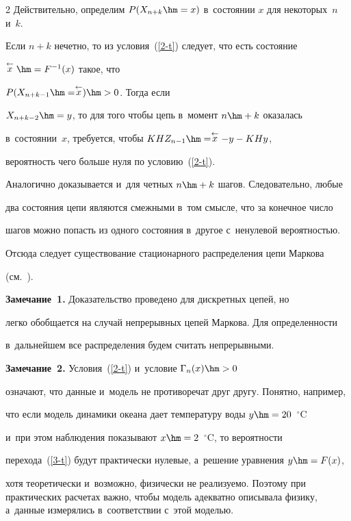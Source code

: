 \begin{multicols}{2}
Действительно, определим $P(X_{n+k}\hm=x)$ в~состоянии $x$ для некоторых~$n$ и~$k$.

Если $n+k$ нечетно, то из условия~(\ref{2-t}) следует, что есть состояние

$\stackrel{\leftarrow}{x}\hm=F^{-1}(x)$ такое, что

$P(X_{n+k-1}\hm=\stackrel{\leftarrow}{x})\hm>0$. Тогда если

$X_{n+k-2}\hm=y$, то для того чтобы цепь в~момент $n\hm+k$ оказалась

в~состоянии~$x$, требуется, чтобы  $KHZ_{n-1}\hm=\stackrel{\leftarrow}{x}-y-KHy$,

вероятность чего больше нуля по условию~(\ref{2-t}).

Аналогично доказывается и~для четных $n\hm+k$ шагов. Следовательно, любые

два состояния цепи являются смежными в~том смысле, что за конечное число

шагов можно попасть из одного состояния в~другое с~ненулевой вероятностью.

Отсюда следует существование стационарного распределения цепи Маркова

 (см.~\cite{Gikhman}).



\smallskip



\noindent

\textbf{Замечание~1.} Доказательство проведено для дискретных цепей, но

легко обобщается на случай непрерывных цепей Маркова. Для опре\-де\-лен\-ности

в~дальнейшем все распределения будем считать непрерывными.



\smallskip



\noindent

\textbf{Замечание~2.} Условия~(\ref{2-t}) и~условие $\Gamma_n(x)\hm>0 $

означают, что данные и~модель не противоречат друг другу. Понятно, например,

что если модель динамики океана дает температуру воды $y\hm=20$~$^\circ$C

и~при этом наблюдения показывают $x\hm=2$~$^\circ$C, то вероятности

перехода~(\ref{3-t}) будут практически нулевые, а~решение уравнения $y\hm=F(x)$,

хотя теоретически и~возможно, физически не реализуемо. Поэтому при практических расчетах важно, чтобы модель адекватно описывала физику, а~данные измерялись в~соответствии с~этой моделью.	




\end{multicols}
